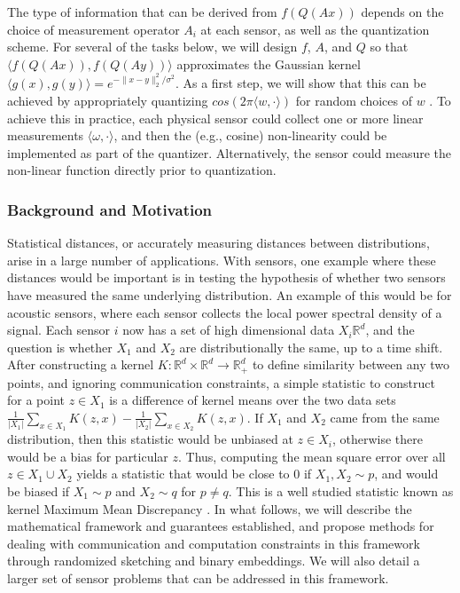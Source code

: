 \documentclass{article}
\newcommand{\comment}[3]{{\color{#1} {\bf #2 :} #3}}
\newcommand{\yoav}[1]{\comment{magenta}{Yoav}{#1}}
\begin{document}
The type of information that can be derived from $f(Q(Ax))$ depends on
the choice of measurement operator $A_i$ at each sensor, as well as
the quantization scheme.  For several of the tasks below, we will
design $f$, $A$, and $Q$ so that $\langle f(Q(Ax)), f(Q(Ay))\rangle$
approximates the Gaussian kernel $\langle g(x), g(y) \rangle =
e^{-\|x-y\|_2^2/\sigma^2}$.  As a first step, we will show that this
can be achieved by appropriately quantizing $cos(2\pi \langle w, \cdot
\rangle)$ for random choices of $w$ \cite{rahimi2008random}. To
achieve this in practice, each physical sensor could collect one or
more linear measurements $\langle \omega, \cdot \rangle$, and then the
(e.g., cosine) non-linearity could be implemented as part of the
quantizer. Alternatively, the sensor could measure the non-linear
function directly prior to quantization.

\subsubsection*{Background and Motivation}

Statistical distances, or accurately measuring distances between distributions, arise in a large number of applications.  With sensors, one example where these distances would be important is in testing the hypothesis of whether two sensors have measured the same underlying distribution.  An example of this would be for acoustic sensors, where each sensor collects the local power spectral density of a signal.  Each sensor $i$ now has a set of high dimensional data $X_i\mathbb{R}^d$, and the question is whether $X_1$ and $X_2$ are distributionally the same, up to a time shift.  After constructing a kernel $K: \mathbb{R}^d\times \mathbb{R}^d \rightarrow \mathbb{R}^d_+$ to define similarity between any two points, and ignoring communication constraints, a simple statistic to construct for a point $z\in X_1$ is a difference of kernel means over the two data sets $\frac{1}{|X_1|}\sum_{x\in X_1} K(z,x) - \frac{1}{|X_2|}\sum_{x\in X_2} K(z,x)$.  If $X_1$ and $X_2$ came from the same distribution, then this statistic would be unbiased at $z\in X_i$, otherwise there would be a bias for particular $z$.  Thus, computing the mean square error over all $z\in X_1\cup X_2$ yields a statistic that would be close to 0 if $X_1,X_2\sim p$, and would be biased if $X_1\sim p$ and $X_2\sim q$ for $p\neq q$.  This is a well studied statistic known as kernel Maximum Mean Discrepancy \cite{}.  In what follows, we will describe the mathematical framework and guarantees established, and propose methods for dealing with communication and computation constraints in this framework through randomized sketching and binary embeddings.  We will also detail a larger set of sensor problems that can be addressed in this framework.
\end{document}
